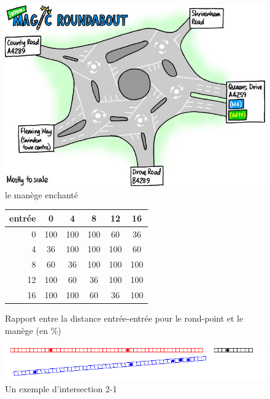 \documentclass[11pt]{article}
\begin{document}
\begin{figure}[p]
	\begin{center}
		\caption{\label{rp}le manège enchanté}
		\includegraphics[scale=0.4]{images/magic-brit}
	\end{center}
\end{figure}



\begin{figure}[p]
	\begin{center}
	\begin{tabular}{ r|c c c c c}
  entrée & 0 & 4 & 8 & 12 & 16 \\ \hline
  0 & 100 & 100 & 100 & 60 & 36 \\
4 & 36 & 100 & 100 & 100 & 60 \\
8 & 60 & 36 & 100 & 100 & 100 \\
12 & 100 & 60 & 36 & 100 & 100 \\
16 & 100 & 100 & 60 & 36 & 100 \\
	\end{tabular}
	\end{center}
	\caption{\label{rpfw} Rapport entre la distance entrée-entrée pour le rond-point et le manège (en \%)}

\end{figure}


	\begin{figure}[hp]
		\begin{center}
			\includegraphics[scale=0.8]{./images/localdebut}
		\end{center}
		\caption{\label{locdeb}Un exemple d'intersection 2-1}
	\end{figure}
\end{document}
